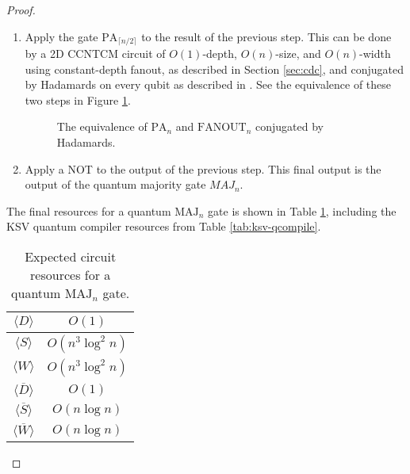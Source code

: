 \begin{proof}
\begin{enumerate}
\item
Apply the gate $\text{PA}_{\lceil n/2 \rceil}$ to the result of
the previous step. This can be done by a \textsf{2D CCNTCM} circuit of
$O(1)$-depth, $O(n)$-size, and $O(n)$-width using constant-depth
fanout, as described in Section \ref{sec:cdc}, and conjugated by
Hadamards on every qubit as described in \cite{Moore1998}. See
the equivalence of these two steps in Figure \ref{fig:pa-fanout}.

\begin{figure}[htb!]
\caption{The equivalence of $\text{PA}_n$ and $\text{FANOUT}_n$ conjugated by Hadamards.}
\label{fig:pa-fanout}
\end{figure}

\item
Apply a NOT to the output of the previous step. This final
output is the output of the quantum majority gate $MAJ_{n}$.

\end{enumerate}

The final resources for a quantum $\text{MAJ}_n$ gate is shown in
Table \ref{tab:maj-resources}, including the KSV quantum compiler
resources from Table \ref{tab:ksv-qcompile}.

\begin{table}[htb!]
\begin{tabular}{c|c|}
\hline
$\langle D \rangle$ & $O(1)$ \\
\hline
$\langle S \rangle$ & $O(n^3\log^2 n)$ \\
\hline
$\langle W \rangle$ & $O(n^3 \log^2 n)$ \\
\hline
$\langle \overline{D} \rangle$ & $O(1)$ \\
\hline
$\langle \overline{S} \rangle$ & $O(n\log n)$ \\
\hline
$\langle \overline{W} \rangle$ & $O(n\log n)$ \\
\hline
\end{tabular}
\caption{Expected circuit resources for a quantum $\text{MAJ}_n$ gate.}
\label{tab:maj-resources}
\end{table}

\end{proof}